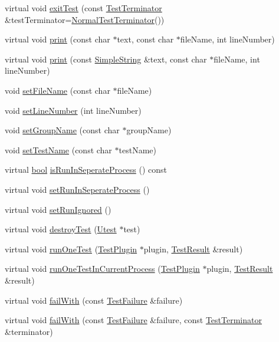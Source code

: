 \begin{DoxyCompactItemize}
\item 
virtual void \hyperlink{class_utest_shell_a458328ad1ce8e11040bc388f27d26975}{exit\+Test} (const \hyperlink{class_test_terminator}{Test\+Terminator} \&test\+Terminator=\hyperlink{class_normal_test_terminator}{Normal\+Test\+Terminator}())
\item 
virtual void \hyperlink{class_utest_shell_a9e7f161718569c365ee9bc9b5c3bfd28}{print} (const char $\ast$text, const char $\ast$file\+Name, int line\+Number)
\item 
virtual void \hyperlink{class_utest_shell_a864d937ec0d0bc780e4495a95ce79bb5}{print} (const \hyperlink{class_simple_string}{Simple\+String} \&text, const char $\ast$file\+Name, int line\+Number)
\item 
void \hyperlink{class_utest_shell_a276904542d6a7885b80ea9e494e8bc20}{set\+File\+Name} (const char $\ast$file\+Name)
\item 
void \hyperlink{class_utest_shell_ab16999ec38298569f6eb6933ca0416b3}{set\+Line\+Number} (int line\+Number)
\item 
void \hyperlink{class_utest_shell_a1bd15ccf10b94d820271b74ff6e9c534}{set\+Group\+Name} (const char $\ast$group\+Name)
\item 
void \hyperlink{class_utest_shell_adcba7e1f936ea12d57c7ef2949c9fd08}{set\+Test\+Name} (const char $\ast$test\+Name)
\item 
virtual \hyperlink{avb__gptp_8h_af6a258d8f3ee5206d682d799316314b1}{bool} \hyperlink{class_utest_shell_a24f44ff874b460e5e055050af80fb302}{is\+Run\+In\+Seperate\+Process} () const 
\item 
virtual void \hyperlink{class_utest_shell_a2bcc7ce67efa05a04dbc8ab8760d1854}{set\+Run\+In\+Seperate\+Process} ()
\item 
virtual void \hyperlink{class_utest_shell_a861854e4e01f41f5bcc490a0dc0621b0}{set\+Run\+Ignored} ()
\item 
virtual void \hyperlink{class_utest_shell_a797d022228765f30bd7455a863011797}{destroy\+Test} (\hyperlink{class_utest}{Utest} $\ast$test)
\item 
virtual void \hyperlink{class_utest_shell_a86b5bcccee3889c16117ea5cccee12b5}{run\+One\+Test} (\hyperlink{class_test_plugin}{Test\+Plugin} $\ast$plugin, \hyperlink{class_test_result}{Test\+Result} \&result)
\item 
virtual void \hyperlink{class_utest_shell_a468a088beac3c881bdaea58bc6acaecf}{run\+One\+Test\+In\+Current\+Process} (\hyperlink{class_test_plugin}{Test\+Plugin} $\ast$plugin, \hyperlink{class_test_result}{Test\+Result} \&result)
\item 
virtual void \hyperlink{class_utest_shell_ad50ae28f5ad9f1d224832cb1f89365a7}{fail\+With} (const \hyperlink{class_test_failure}{Test\+Failure} \&failure)
\item 
virtual void \hyperlink{class_utest_shell_a5deb4c5d28a360e44345deea323d5db7}{fail\+With} (const \hyperlink{class_test_failure}{Test\+Failure} \&failure, const \hyperlink{class_test_terminator}{Test\+Terminator} \&terminator)
\end{DoxyCompactItemize}
